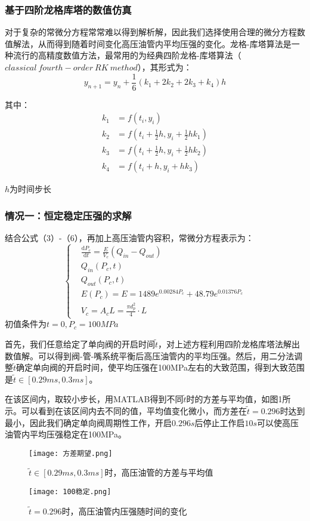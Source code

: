 \documentclass[withoutpreface,bwprint]{cumcmthesis} %
\begin{document}
			\subsubsection{基于四阶龙格库塔的数值仿真}
			对于复杂的常微分方程常常难以得到解析解，因此我们选择使用合理的微分方程数值解法，从而得到随着时间变化高压油管内平均压强的变化。龙格-库塔算法是一种流行的高精度数值方法，最常用的为经典四阶龙格-库塔算法（$classical\ fourth-order\ RK\ method$），其形式为：
			\[
			y_{n+1}=y_{n}+\frac{1}{6}(k_{1}+2k_{2}+2k_{3}+k_{4})h
			\]
			
			其中：
			\begin{align*}
			k_{1}&=f(t_{i},y_{i})\\
			k_{2}&=f(t_{i}+\frac{1}{2}h,y_{i}+\frac{1}{2}hk_{1})\\
			k_{3}&=f(t_{i}+\frac{1}{2}h,y_{i}+\frac{1}{2}hk_{2})\\
			k_{4}&=f(t_{i}+h,y_{i}+hk_{3})
			\end{align*}
			
			$h$为时间步长
			\subsubsection{情况一：恒定稳定压强的求解}
			结合公式（3）-（6），再加上高压油管内容积，常微分方程表示为：
			\begin{equation} \left\{
			\begin{aligned}
			&\frac{\mathrm{d}P_c}{\mathrm{d}t} = \frac{E}{V_c}(Q_{in} - Q_{out}) \\
			&Q_{in} (P_c,t) \\
			&Q_{out} (P_c,t) \\
			&E(P_c) = E = 1489 e^{0.00284P_c} + 48.79 e^{0.01376 P_c} \\
			&V_c = A_cL = \frac{\pi d_p^2}{4} \cdot L
			\end{aligned}
			\right. \end{equation}
			初值条件为$t = 0, P_c = 100MPa$
			
			
			首先，我们任意给定了单向阀的开启时间$\widetilde{t}$，对上述方程利用四阶龙格库塔法解出数值解。可以得到阀-管-嘴系统平衡后高压油管内的平均压强。然后，用二分法调整$\widetilde{t}$确定单向阀的开启时间，使平均压强在100MPa左右的大致范围，得到大致范围是$\widetilde{t}\in [0.29ms,0.3ms]$。
			
			在该区间内，取较小步长，用MATLAB得到不同$\widetilde{t}$时的方差与平均值，如图1所示。可以看到在该区间内去不同的值，平均值变化微小，而方差在$\widetilde{t}=0.296$时达到最小，因此我们确定单向阀周期性工作，开启$0.296s$后停止工作启$10s$可以使高压油管内平均压强稳定在100MPa。
			\begin{figure}[!htbp]
				\centering
				\texttt{[image: 方差期望.png]}
				\caption{$\widetilde{t}\in [0.29ms,0.3ms]$时，高压油管的方差与平均值}
			\end{figure}
			\begin{figure}[!htbp]
				\centering
				\texttt{[image: 100稳定.png]}
				\caption{$\widetilde{t}=0.296$时，高压油管内压强随时间的变化}
			\end{figure}			
\end{document}
